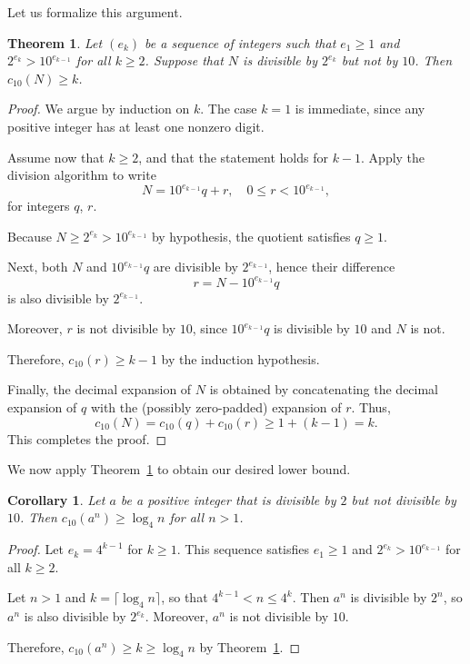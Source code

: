 \documentclass[12pt]{amsart}
\newtheorem{theorem}{Theorem}
\newtheorem{corollary}{Corollary}
\theoremstyle{remark}
\begin{document}
Let us formalize this argument.

\begin{theorem} \label{thm:digit-sum-bound-2-to-n}
    Let $(e_k)$ be a sequence of integers such that
    $e_1 \ge 1$ and $2^{e_k} > 10^{e_{k-1}}$ for all $k \ge 2$.
    Suppose that $N$ is divisible by $2^{e_{k}}$ but not by $10$.
    Then $c_{10}(N) \ge k$.
\end{theorem}

\begin{proof}
    We argue by induction on $k$.
    The case $k=1$ is immediate, since any positive integer
    has at least one nonzero digit.

    Assume now that $k \ge 2$, and that the statement holds for $k-1$.
    Apply the division algorithm to write
    \[
        N = 10^{e_{k-1}} q + r, \quad 0 \le r < 10^{e_{k-1}},
    \]
    for integers $q$, $r$.

    Because $N \ge 2^{e_k} > 10^{e_{k-1}}$ by hypothesis,
    the quotient satisfies $q \ge 1$.

    Next, both $N$ and $10^{e_{k-1}} q$ are divisible by $2^{e_{k-1}}$,
    hence their difference
    \[
        r = N - 10^{e_{k-1}} q
    \]
    is also divisible by $2^{e_{k-1}}$.

    Moreover, $r$ is not divisible by $10$, since $10^{e_{k-1}} q$
    is divisible by $10$ and $N$ is not.

    Therefore, $c_{10}(r) \ge k - 1$ by the induction hypothesis.

    Finally, the decimal expansion of $N$ is obtained by concatenating
    the decimal expansion of $q$ with the (possibly zero-padded)
    expansion of $r$. Thus,
    \[
        c_{10}(N) = c_{10}(q) + c_{10}(r) \ge 1 + (k - 1) = k.
    \]
    This completes the proof.
\end{proof}

We now apply Theorem~\ref{thm:digit-sum-bound-2-to-n} to obtain our desired lower bound.

\begin{corollary} \label{even-powers-base-ten-limit}
    Let $a$ be a positive integer that is divisible by $2$ but not divisible by $10$.
    Then $c_{10}(a^n) \ge \log_4 n$ for all $n > 1$.
\end{corollary}

\begin{proof}
    Let $e_{k} = 4^{k-1}$ for $k \ge 1$.
    This sequence satisfies $e_{1} \ge 1$ and $2^{e_{k}} > 10^{e_{k-1}}$ for all $k \ge 2$.

    Let $n > 1$ and $k = \lceil \log_4 n \rceil$,
    so that $4^{k-1} < n \le 4^k$. Then $a^n$ is divisible by $2^n$,
    so $a^n$ is also divisible by $2^{e_{k}}$.
    Moreover, $a^n$ is not divisible by $10$.

    Therefore, $c_{10}(a^n) \ge k \ge \log_4 n$ by Theorem~\ref{thm:digit-sum-bound-2-to-n}.
\end{proof}
\end{document}
